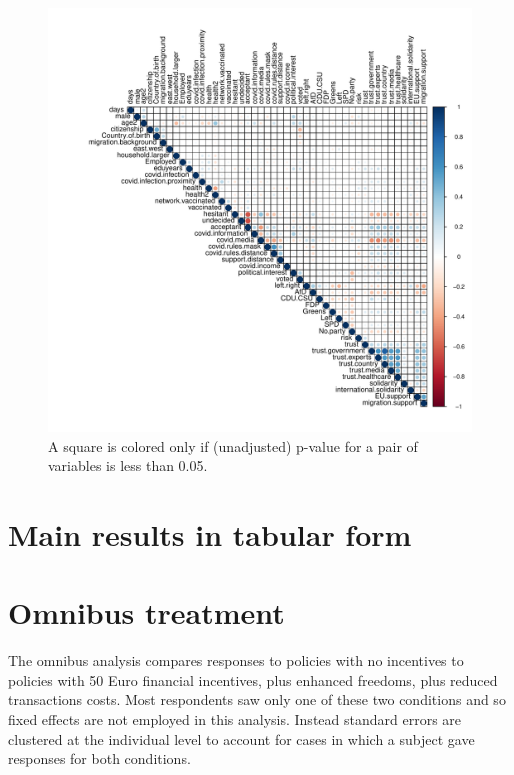 \documentclass[12pt]{article}
\begin{document}
\begin{figure}[h!]
	\centering
	\includegraphics[width=1\linewidth]{figures/figure_6.pdf}
	\caption{A square is colored only if (unadjusted) p-value for a pair of variables is less than 0.05.}
\end{figure}


\clearpage

\section{Main results in tabular form}



\clearpage
\section{Omnibus treatment}  

The omnibus analysis compares responses to policies with no incentives to policies with 50 Euro financial incentives, plus enhanced freedoms, plus reduced transactions costs. Most respondents saw only one of these two conditions and so fixed effects are not employed in this analysis. Instead standard errors are clustered at the individual level to account for cases in which a subject gave responses for both conditions. 
\end{document}
